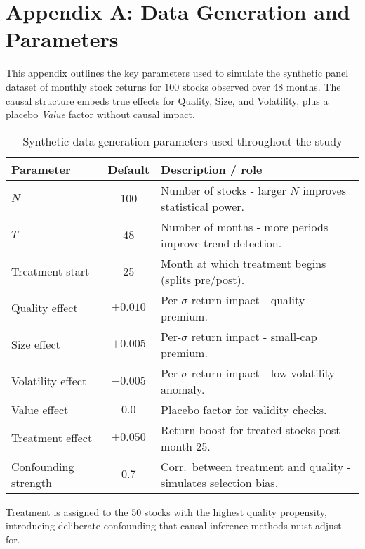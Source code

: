 
\chapter{Appendix A: Data Generation and Parameters}
\label{cha: Appendix A}

This appendix outlines the key parameters used to simulate the synthetic
panel dataset of monthly stock returns for 100 stocks observed over 48 months.
The causal structure embeds true effects for Quality, Size, and Volatility,
plus a placebo \emph{Value} factor without causal impact.

\begin{table}[H]
    \centering
    \caption{Synthetic-data generation parameters used throughout the study}
    \begin{tabular}{|l|c|p{7cm}|}
        \hline
        \textbf{Parameter} & \textbf{Default} & \textbf{Description / role} \\
        \hline
        $N$ & 100 & Number of stocks - larger $N$ improves statistical power. \\[0.2em]
$T$ & 48  & Number of months - more periods improve trend detection. \\[0.2em]
        Treatment start & 25 & Month at which treatment begins (splits pre/post). \\[0.2em]
        Quality effect & $+0.010$ & Per-$\sigma$ return impact - quality premium. \\[0.2em]
Size effect & $+0.005$ & Per-$\sigma$ return impact - small-cap premium. \\[0.2em]
Volatility effect & $-0.005$ & Per-$\sigma$ return impact - low-volatility anomaly. \\[0.2em]
        Value effect & $0.0$ & Placebo factor for validity checks. \\[0.2em]
        Treatment effect & $+0.050$ & Return boost for treated stocks post-month 25. \\[0.2em]
        Confounding strength & $0.7$ & Corr.\ between treatment and quality - simulates selection bias. \\
        \hline
    \end{tabular}
\end{table}

\vspace{0.5em}
\noindent
Treatment is assigned to the 50 stocks with the highest quality propensity,
introducing deliberate confounding that causal-inference methods must adjust for.

